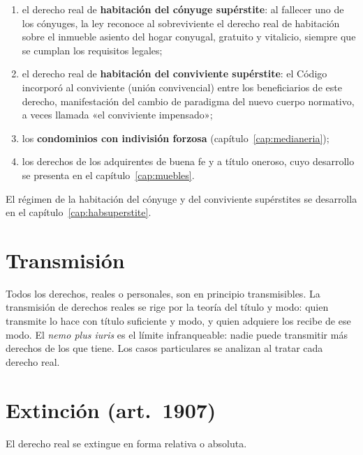 \documentclass[12pt,oneside]{book}
\begin{document}
\begin{enumerate}
    \item el derecho real de \textbf{habitación del cónyuge supérstite}: al fallecer uno de los cónyuges, la ley reconoce al sobreviviente el derecho real de habitación sobre el inmueble asiento del hogar conyugal, gratuito y vitalicio, siempre que se cumplan los requisitos legales;
    \item el derecho real de \textbf{habitación del conviviente supérstite}: el Código incorporó al conviviente (unión convivencial) entre los beneficiarios de este derecho, manifestación del cambio de paradigma del nuevo cuerpo normativo, a veces llamada «el conviviente impensado»;
    \item los \textbf{condominios con indivisión forzosa} (capítulo~\ref{cap:medianeria});
    \item los derechos de los adquirentes de buena fe y a título oneroso, cuyo desarrollo se presenta en el capítulo~\ref{cap:muebles}.
\end{enumerate}
El régimen de la habitación del cónyuge y del conviviente supérstites se desarrolla en el capítulo~\ref{cap:habsuperstite}.

\section{Transmisión}

Todos los derechos, reales o personales, son en principio transmisibles. La transmisión de derechos reales se rige por la teoría del título y modo: quien transmite lo hace con título suficiente y modo, y quien adquiere los recibe de ese modo. El \textit{nemo plus iuris} es el límite infranqueable: nadie puede transmitir más derechos de los que tiene. Los casos particulares se analizan al tratar cada derecho real.

\section{Extinción (art.~1907)}

El derecho real se extingue en forma relativa o absoluta.
\end{document}
